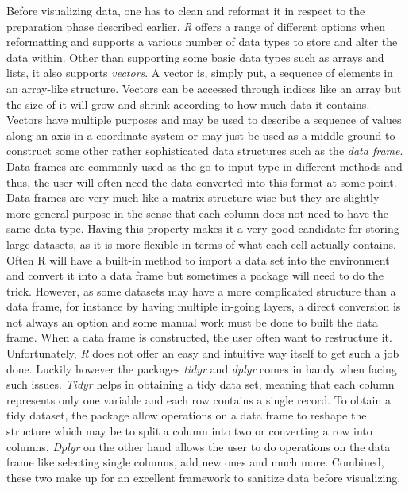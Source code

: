 \documentclass[Report.tex]{subfiles}
\begin{document}
 Before visualizing data, one has to clean and reformat it in respect to the preparation phase described earlier. \textit{R} offers a range of different options when reformatting and supports a various number of data  types to store and alter the data within. Other than supporting some basic data types such as arrays and lists, it also supports \textit{vectors}. A vector is, simply put, a sequence of elements in an array-like structure. Vectors can be accessed through indices like an array but the size of it will grow and shrink according to how much data it contains. Vectors have multiple purposes and may be used to describe a sequence of values along an axis in a coordinate system or may just be used as a middle-ground to construct some other rather sophisticated data structures such as the \textit{data frame}. Data frames are commonly used as the go-to input type in different methods and thus, the user will often need the data converted into this format at some point. Data frames are very much like a matrix structure-wise but they are slightly more general purpose in the sense that each column does not need to have the same data type. Having this property makes it a very good candidate for storing large datasets, as it is more flexible in terms of what each cell actually contains. Often R will have a built-in method to import a data set into the environment and convert it into a data frame but sometimes a package will need to do the trick. However, as some datasets may have a more complicated structure than a data frame, for instance by having multiple in-going layers, a direct conversion is not always an option and some manual work must be done to built the data frame. When a data frame is constructed, the user often want to restructure it. Unfortunately, \textit{R} does not offer an easy and intuitive way itself to get such a job done. Luckily however the packages \textit{tidyr} and  \textit{dplyr} comes in handy when facing such issues. \textit{Tidyr} helps in obtaining a tidy data set, meaning that each column represents only one variable and each row contains a single record. To obtain a tidy dataset, the package allow operations on a data frame to reshape the structure which may be to split a column into two or converting a row into columns. \textit{Dplyr} on the other hand allows the user to do operations on the data frame like selecting single columns, add new ones and much more. Combined, these two make up for an excellent framework to sanitize data before visualizing.\\
 
\end{document}
